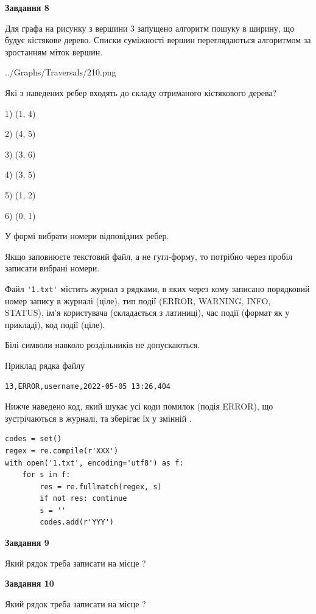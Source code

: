 \documentclass[12pt, ukrainian]{article}
\def\code#1{\Verb!#1!}
\begin{document}
{\begin {large}
{\begin {center}\textbf{Завдання 8}\end {center}}\par
Для графа на рисунку з вершини 3 запущено алгоритм пошуку в ширину, що будує кістякове дерево. Списки суміжності вершин переглядаються алгоритмом за зростанням міток вершин.\par
\begin{center}
	{../Graphs/Traversals/210.png}
\end{center}
\par Які з наведених ребер входять до складу отриманого кістякового дерева?\par
1) (1, 4)\par
2) (4, 5)\par
3) (3, 6)\par
4) (3, 5)\par
5) (1, 2)\par
6) (0, 1)\par
{\vskip 15pt} У формі вибрати номери відповідних ребер.


Якщо заповнюєте текстовий файл, а не гугл-форму, то потрібно через пробіл записа\-ти вибрані номери.\par
\newpage


Файл \code{'1.txt'} містить журнал з рядками, в яких через кому записано поряд\-ко\-вий номер запису в журналі (ціле), тип події (ERROR, WARNING, INFO, STATUS), ім'я користувача (складається з латиниці), час події (фор\-мат як у прикладі), код події (ціле).

Білі символи навколо роздільників не допускаються.

Приклад рядка файлу



\begin{verbatim}
13,ERROR,username,2022-05-05 13:26,404
\end{verbatim}


Нижче наведено код, який шукає усі коди помилок (подія ERROR), що зустріча\-ють\-ся в журналі, та зберігає їх у змінній .



\begin{verbatim}
codes = set()
regex = re.compile(r'XXX')
with open('1.txt', encoding='utf8') as f:
    for s in f:
        res = re.fullmatch(regex, s)
        if not res: continue
        s = ''
        codes.add(r'YYY')
\end{verbatim}


{\begin {center}\textbf{Завдання 9}\end {center}}\par
Який рядок треба записати на місце  ?\par
\vspace{5mm}


{\begin {center}\textbf{Завдання 10}\end {center}}\par
Який рядок треба записати на місце  ?\par


\newpage


\end {large}}
\end{document}

